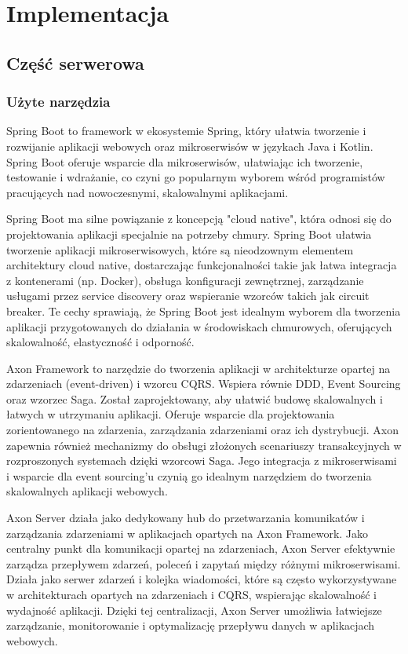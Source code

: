\clearpage %

\section{Implementacja}

\subsection{Część serwerowa}

\subsubsection{Użyte narzędzia}

Spring Boot \cite{springboot} to framework w ekosystemie Spring, który ułatwia tworzenie i rozwijanie aplikacji webowych oraz mikroserwisów w językach Java i Kotlin. Spring Boot oferuje wsparcie dla mikroserwisów, ułatwiając ich tworzenie, testowanie i wdrażanie, co czyni go popularnym wyborem wśród programistów pracujących nad nowoczesnymi, skalowalnymi aplikacjami.

Spring Boot ma silne powiązanie z koncepcją "cloud native", która odnosi się do projektowania aplikacji specjalnie na potrzeby chmury. Spring Boot ułatwia tworzenie aplikacji mikroserwisowych, które są nieodzownym elementem architektury cloud native, dostarczając funkcjonalności takie jak łatwa integracja z kontenerami (np. Docker), obsługa konfiguracji zewnętrznej, zarządzanie usługami przez service discovery oraz wspieranie wzorców takich jak circuit breaker. Te cechy sprawiają, że Spring Boot jest idealnym wyborem dla tworzenia aplikacji przygotowanych do działania w środowiskach chmurowych, oferujących skalowalność, elastyczność i odporność.

Axon Framework to narzędzie do tworzenia aplikacji w architekturze opartej na zdarzeniach (event-driven) i wzorcu CQRS. Wspiera równie DDD, Event Sourcing oraz wzorzec Saga. Został zaprojektowany, aby ułatwić budowę skalowalnych i łatwych w utrzymaniu aplikacji. Oferuje wsparcie dla projektowania zorientowanego na zdarzenia, zarządzania zdarzeniami oraz ich dystrybucji. Axon zapewnia również mechanizmy do obsługi złożonych scenariuszy transakcyjnych w rozproszonych systemach dzięki wzorcowi Saga. Jego integracja z mikroserwisami i wsparcie dla event sourcing'u czynią go idealnym narzędziem do tworzenia skalowalnych aplikacji webowych.

Axon Server działa jako dedykowany hub do przetwarzania komunikatów i zarządzania zdarzeniami w aplikacjach opartych na Axon Framework. Jako centralny punkt dla komunikacji opartej na zdarzeniach, Axon Server efektywnie zarządza przepływem zdarzeń, poleceń i zapytań między różnymi mikroserwisami. Działa jako serwer zdarzeń i kolejka wiadomości, które są często wykorzystywane w architekturach opartych na zdarzeniach i CQRS, wspierając skalowalność i wydajność aplikacji. Dzięki tej centralizacji, Axon Server umożliwia łatwiejsze zarządzanie, monitorowanie i optymalizację przepływu danych w aplikacjach webowych.

